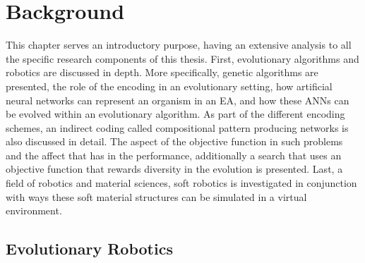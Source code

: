 
\chapter{Background} %

\label{Background} %


This chapter serves an introductory purpose, having an extensive analysis to all the specific research components of this thesis. First, evolutionary algorithms and robotics are discussed in depth. More specifically, genetic algorithms are presented, the role of the encoding in an evolutionary setting,  how artificial neural networks can represent an organism in an EA, and how these ANNs can be evolved within an evolutionary algorithm. As part of the different encoding schemes, an indirect coding called compositional pattern producing networks is also discussed in detail. The aspect of the objective function in such problems and the affect that has in the performance, additionally a search that uses an objective function that rewards diversity in the evolution is presented. Last, a field of robotics and material sciences, soft robotics is investigated in conjunction with ways these soft material structures can be simulated in a virtual environment.


\section{Evolutionary Robotics}

